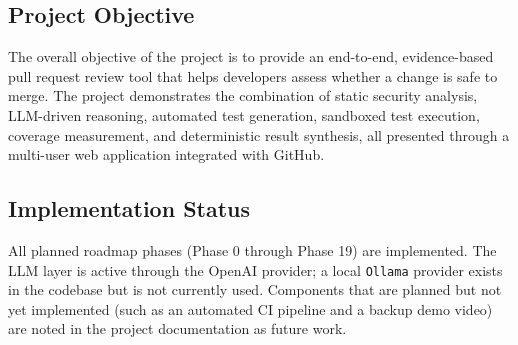 \subsection{Project Objective}

The overall objective of the project is to provide an end-to-end,
evidence-based pull request review tool that helps developers assess whether a
change is safe to merge. The project demonstrates the combination of static
security analysis, LLM-driven reasoning, automated test generation, sandboxed
test execution, coverage measurement, and deterministic result synthesis, all
presented through a multi-user web application integrated with GitHub.

\subsection{Implementation Status}

All planned roadmap phases (Phase 0 through Phase 19) are implemented. The
LLM layer is active through the OpenAI provider; a local \texttt{Ollama}
provider exists in the codebase but is not currently used. Components that are
planned but not yet implemented (such as an automated CI pipeline and a backup
demo video) are noted in the project documentation as future work.
